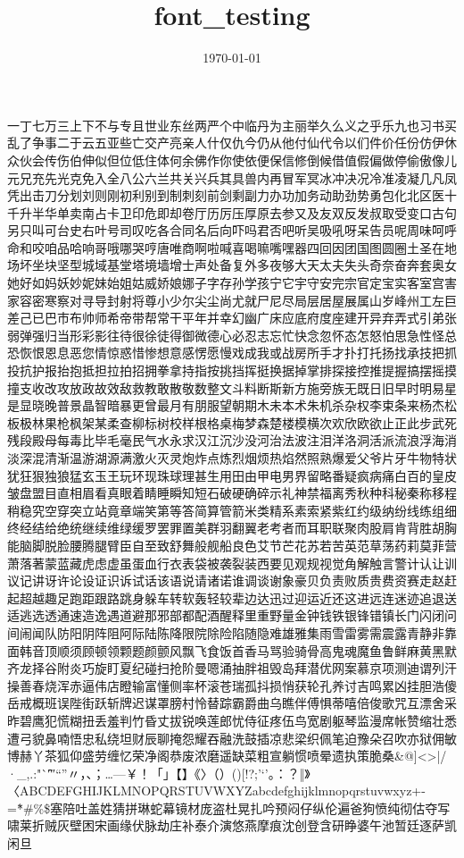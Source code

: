 \documentclass[30pt]{article}
\title{font_testing}
\date{\today}
\begin{document}
\LARGE  一丁七万三上下不与专且世业东丝两严个中临丹为主丽举久么义之乎乐九也习书买乱了争事二于云五亚些亡交产亮亲人什仅仇今仍从他付仙代令以们件价任份仿伊休众伙会传伤伯伸似但位低住体何余佛作你使依便保信修倒候借值假偏做停偷傲像儿元兄充先光克免入全八公六兰共关兴兵其具兽内再冒军冥冰冲决况冷准凌凝几凡凤凭出击刀分划刘则刚初利别到制刺刻前剑剩副力办功加务动助劲势勇包化北区医十千升半华单卖南占卡卫印危即却卷厅历厉压厚原去参又及友双反发叔取受变口古句另只叫可台史右叶号司叹吃各合同名后向吓吗君否吧听吴吸吼呀呆告员呢周味呵呼命和咬咱品哈响哥哦哪哭哼唐唯商啊啦喊喜喝嘛嘴嘿器四回因团国图圆圈土圣在地场坏坐块坚型城域基堂塔境墙增士声处备复外多夜够大天太夫失头奇奈奋奔套奥女她好如妈妖妙妮妹始姐姑威娇娘娜子字存孙学孩宁它宇守安完宗官定宝实客室宫害家容密寒察对寻导封射将尊小少尔尖尘尚尤就尸尼尽局层居屋展属山岁峰州工左巨差己已巴市布帅师希帝带帮常干平年并幸幻幽广床应底府度座建开异弃弄式引弟张弱弹强归当形彩影往待很徐徒得御微德心必忍志忘忙快念忽怀态怎怒怕思急性怪总恐恢恨恩息恶您情惊惑惜惨想意感愣愿慢戏成我或战房所手才扑打托扬找承技把抓投抗护报抬抱抵担拉拍招拥拳拿持指按挑挡挥挺换据掉掌排探接控推提握搞摆摇摸撞支收改攻放政故效敌救教敢散敬数整文斗料断斯新方施旁族无既日旧早时明易星是显晓晚普景晶智暗暴更曾最月有朋服望朝期木未本术朱机杀杂权李束条来杨杰松板极林果枪枫架某柔查柳标树校样根格桌梅梦森楚楼模横次欢欣欧欲止正此步武死残段殿母每毒比毕毛毫民气水永求汉江沉沙没河治法波注泪洋洛洞活派流浪浮海消淡深混清渐温游湖源满激火灭灵炮炸点炼烈烟烦热焰然照熟爆爱父爷片牙牛物特状犹狂狠独狼猛玄玉王玩环现珠球理甚生用田由甲电男界留略番疑疯病痛白百的皇皮皱盘盟目直相眉看真眼着睛睡瞬知短石破硬确碎示礼神禁福离秀秋种科秘秦称移程稍稳究空穿突立站竟章端笑第等答简算管箭米类精系素索紧紫红约级纳纷线练组细终经结给绝统继续维绿缓罗罢罪置美群羽翻翼老考者而耳职联聚肉股肩肯背胜胡胸能脑脚脱脸腰腾腿臂臣自至致舒舞般舰船良色艾节芒花苏若苦英范草荡药莉莫菲营萧落著蒙蓝藏虎虑虚虽蛋血行衣表袋被袭裂装西要见观规视觉角解触言警计认让训议记讲讶许论设证识诉试话该语说请诸诺谁调谈谢象豪贝负责败质贵费资赛走赵赶起超越趣足跑距跟路跳身躲车转软轰轻较辈边达迅过迎运近还这进远连迷迹追退送适逃选透通速造逸遇道避那邪部都配酒醒释里重野量金钟钱铁银锋错镇长门闪闭问间闹闻队防阳阴阵阻阿际陆陈降限院除险陷随隐难雄雅集雨雪雷雾需震露青静非靠面韩音顶顺须顾顿领颗题颜颤风飘飞食饭首香马骂验骑骨高鬼魂魔鱼鲁鲜麻黄黑默齐龙择谷附炎巧旋盯夏纪碰扫抢阶曼嗯涌抽胖祖毁岛拜潜优网案慕京项测迪谓列汗操善春烧浑赤逼伟店瞪输富懂侧率杯滚苍瑞孤抖损悄获轮孔养讨吉鸣累凶挂胆浩傻岳戒概班误陛街跃斩牌迟谋罩膀村怜替踪霸爵曲乌瞧伴傅惧蒂嘻倍俊歌咒互漂舍采昨碧鹰犯慌糊扭丢羞判竹昏丈拔锐唤莲郎忧侍征疼伍鸟宽剧躯琴监漫席帐赞缩壮悉遭弓貌鼻喃悟忠私绕坦财辰聊掩怨耀吞融洗鼓插凉悲梁织佩笔迫豫朵召吹亦狱佣敏博赫丫茶狐仰盛劳缠忆荣净阁恭废浓磨遥缺菜粗宣躺惯喷晕遗执策脆桑\&@{}]<>|/·\_,.:"`\^′″“”〃，、；…—￥！「」【】《〉（）()[!?;'‘’。：？‖》〈ABCDEFGHIJKLMNOPQRSTUVWXYZabcdefghijklmnopqrstuvwxyz+- =\~*#\%\$塞陪吐盖姓猜拼琳蛇幕镜材庞盗杜晃扎吟预闷仔纵伦遍爸狗愤纯彻估夺写啸莱折贼灰壁困宋画缘伏脉劫庄补泰介演悠燕摩痕沈创登含研睁婆午池暂廷逐萨凯闲旦
\end{document}
